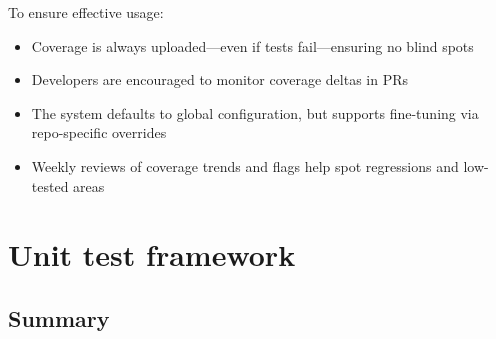 To ensure effective usage:

\begin{itemize}
  \item Coverage is always uploaded---even if tests fail---ensuring no blind
    spots

  \item Developers are encouraged to monitor coverage deltas in PRs

  \item The system defaults to global configuration, but supports fine-tuning
    via repo-specific overrides

  \item Weekly reviews of coverage trends and flags help spot regressions
    and low-tested areas
\end{itemize}

\section{Unit test framework}


\subsection{Summary}

